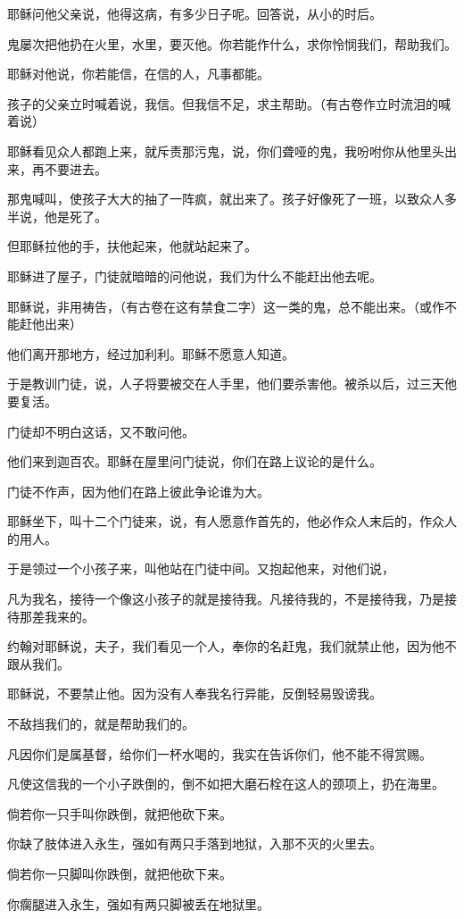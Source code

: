 \documentclass[12pt,oneside]{book}
\begin{document}
耶稣问他父亲说，他得这病，有多少日子呢。回答说，从小的时后。

鬼屡次把他扔在火里，水里，要灭他。你若能作什么，求你怜悯我们，帮助我们。

耶稣对他说，你若能信，在信的人，凡事都能。

孩子的父亲立时喊着说，我信。但我信不足，求主帮助。（有古卷作立时流泪的喊着说）

耶稣看见众人都跑上来，就斥责那污鬼，说，你们聋哑的鬼，我吩咐你从他里头出来，再不要进去。

那鬼喊叫，使孩子大大的抽了一阵疯，就出来了。孩子好像死了一班，以致众人多半说，他是死了。

但耶稣拉他的手，扶他起来，他就站起来了。

耶稣进了屋子，门徒就暗暗的问他说，我们为什么不能赶出他去呢。

耶稣说，非用祷告，（有古卷在这有禁食二字）这一类的鬼，总不能出来。（或作不能赶他出来）

他们离开那地方，经过加利利。耶稣不愿意人知道。

于是教训门徒，说，人子将要被交在人手里，他们要杀害他。被杀以后，过三天他要复活。

门徒却不明白这话，又不敢问他。

他们来到迦百农。耶稣在屋里问门徒说，你们在路上议论的是什么。

门徒不作声，因为他们在路上彼此争论谁为大。

耶稣坐下，叫十二个门徒来，说，有人愿意作首先的，他必作众人末后的，作众人的用人。

于是领过一个小孩子来，叫他站在门徒中间。又抱起他来，对他们说，

凡为我名，接待一个像这小孩子的就是接待我。凡接待我的，不是接待我，乃是接待那差我来的。

约翰对耶稣说，夫子，我们看见一个人，奉你的名赶鬼，我们就禁止他，因为他不跟从我们。

耶稣说，不要禁止他。因为没有人奉我名行异能，反倒轻易毁谤我。

不敌挡我们的，就是帮助我们的。

凡因你们是属基督，给你们一杯水喝的，我实在告诉你们，他不能不得赏赐。

凡使这信我的一个小子跌倒的，倒不如把大磨石栓在这人的颈项上，扔在海里。

倘若你一只手叫你跌倒，就把他砍下来。

你缺了肢体进入永生，强如有两只手落到地狱，入那不灭的火里去。

倘若你一只脚叫你跌倒，就把他砍下来。

你瘸腿进入永生，强如有两只脚被丢在地狱里。
\end{document}
